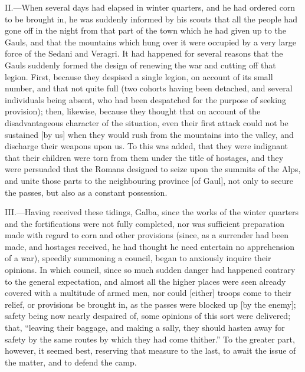 II.—When several days had elapsed in winter quarters, and he had
ordered corn to be brought in, he was suddenly informed by his scouts
that all the people had gone off in the night from that part of the town
which he had given up to the Gauls, and that the mountains which hung
over it were occupied by a very large force of the Sedani and Veragri.
It had happened for several reasons that the Gauls suddenly formed the
design of renewing the war and cutting off that legion. First, because
they despised a single legion, on account of its small number, and that
not quite full (two cohorts having been detached, and several
individuals being absent, who had been despatched for the purpose of
seeking provision); then, likewise, because they thought that on account
of the disadvantageous character of the situation, even their first
attack could not be sustained [by us] when they would rush from the
mountains into the valley, and discharge their weapons upon us. To this
was added, that they were indignant that their children were torn from
them under the title of hostages, and they were persuaded that the
Romans designed to seize upon the summits of the Alps, and unite those
parts to the neighbouring province [of Gaul], not only to secure the
passes, but also as a constant possession.

III.—Having received these tidings, Galba, since the works of the
winter quarters and the fortifications were not fully completed, nor was
sufficient preparation made with regard to corn and other provisions
(since, as a surrender had been made, and hostages received, he had
thought he need entertain no apprehension of a war), speedily summoning
a council, began to anxiously inquire their opinions. In which council,
since so much sudden danger had happened contrary to the general
expectation, and almost all the higher places were seen already covered
with a multitude of armed men, nor could [either] troops come to their
relief, or provisions be brought in, as the passes were blocked up [by
the enemy]; safety being now nearly despaired of, some opinions of this
sort were delivered; that, ``leaving their baggage, and making a sally,
they should hasten away for safety by the same routes by which they had
come thither.'' To the greater part, however, it seemed best, reserving
that measure to the last, to await the issue of the matter, and to
defend the camp.

